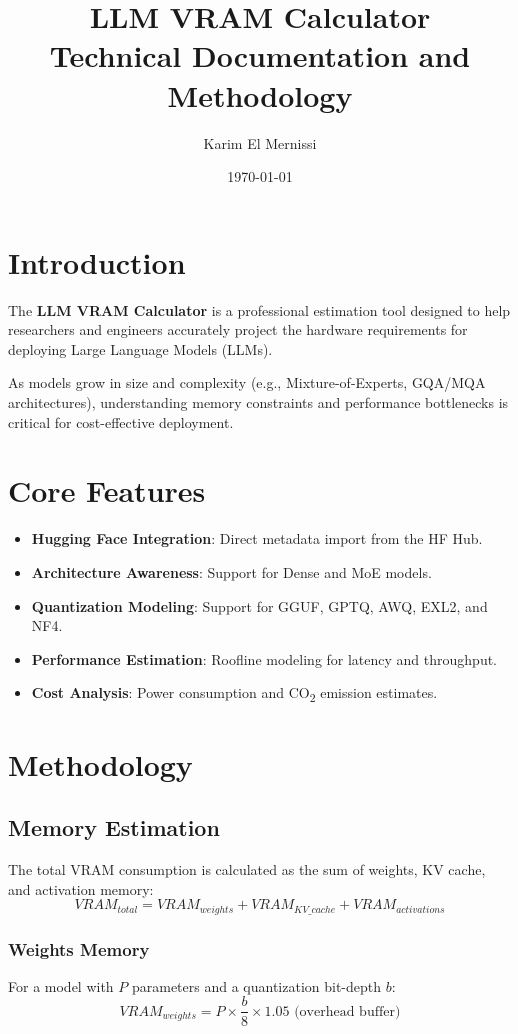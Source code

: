 \documentclass[11pt,a4paper]{article}
\title{
    \vspace{-2cm}
    \textbf{LLM VRAM Calculator} \\
    \large Technical Documentation and Methodology
}
\author{Karim El Mernissi}
\date{\today}
\begin{document}
\maketitle
\tableofcontents
\newpage

\section{Introduction}
The \textbf{LLM VRAM Calculator} is a professional estimation tool designed to help researchers and engineers accurately project the hardware requirements for deploying Large Language Models (LLMs). 

As models grow in size and complexity (e.g., Mixture-of-Experts, GQA/MQA architectures), understanding memory constraints and performance bottlenecks is critical for cost-effective deployment.

\section{Core Features}
\begin{itemize}
    \item \textbf{Hugging Face Integration}: Direct metadata import from the HF Hub.
    \item \textbf{Architecture Awareness}: Support for Dense and MoE models.
    \item \textbf{Quantization Modeling}: Support for GGUF, GPTQ, AWQ, EXL2, and NF4.
    \item \textbf{Performance Estimation}: Roofline modeling for latency and throughput.
    \item \textbf{Cost Analysis}: Power consumption and CO\textsubscript{2} emission estimates.
\end{itemize}

\section{Methodology}
\subsection{Memory Estimation}
The total VRAM consumption is calculated as the sum of weights, KV cache, and activation memory:
\begin{equation}
    VRAM_{total} = VRAM_{weights} + VRAM_{KV\_cache} + VRAM_{activations}
\end{equation}

\subsubsection{Weights Memory}
For a model with $P$ parameters and a quantization bit-depth $b$:
\begin{equation}
    VRAM_{weights} = P \times \frac{b}{8} \times 1.05 \text{ (overhead buffer)}
\end{equation}
\end{document}
